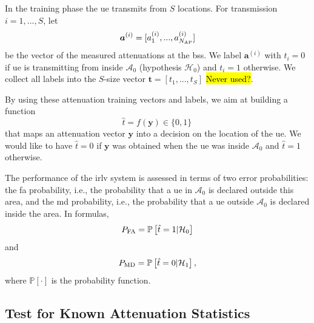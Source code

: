 \documentclass[conference,draftcls,onecolumn]{IEEEtran}
\newcommand{\pr}[1]{\mathbb{P} \left[ #1 \right]}
\begin{document}
In the training phase the \ac{ue} transmits from $S$ locations. For transmission $i=1,...,S$, let
\begin{equation}
    \bm{a}^{(i)}=[a_1^{(i)},...,a_{N_{\rm AP}}^{(i)}]
\end{equation}
be the vector of the measured attenuations at the  \acp{bs}. We label $\bm a ^{(i)}$ with $t_i=0$ if \ac{ue} is transmitting from inside $\mathcal{A}_0$ (hypothesis $\mathcal{H}_0$) and $t_i=1$ otherwise. We collect all labels into the $S$-size vector $\bm{t}=[t_1,...,t_S]$ \hl{Never used?}.

By using these attenuation training vectors and labels, we aim at building a function
\begin{equation}
    \hat{t} = f(\bm{y}) \in \{0,1\}\,
\end{equation}
that maps an attenuation vector $\bm{y}$ into a decision on the location of the \ac{ue}. We would like to have $\hat{t}=0$ if $\bm{y}$ was obtained when the \ac{ue} was inside $\mathcal{A}_0$ and $\hat{t}=1$ otherwise.

The performance of the \ac{irlv} system is assessed in terms of two error probabilities: the \ac{fa} probability, i.e., the probability  that a \ac{ue} in $\mathcal A_0$ is declared outside this area, and the \ac{md} probability, i.e., the probability that a \ac{ue} outside $\mathcal A_0$ is declared inside the area. In formulas, 
\begin{equation}
P_{\rm FA} =\pr{\hat{t} =1 | \mathcal H_0}
\end{equation} 
and  
\begin{equation}
 P_{\rm MD}=\pr{\hat{t} = 0 | \mathcal H_1},   
\end{equation}
where $\pr{\cdot}$ is the probability function.

\subsection{Test for Known Attenuation Statistics}
\end{document}
